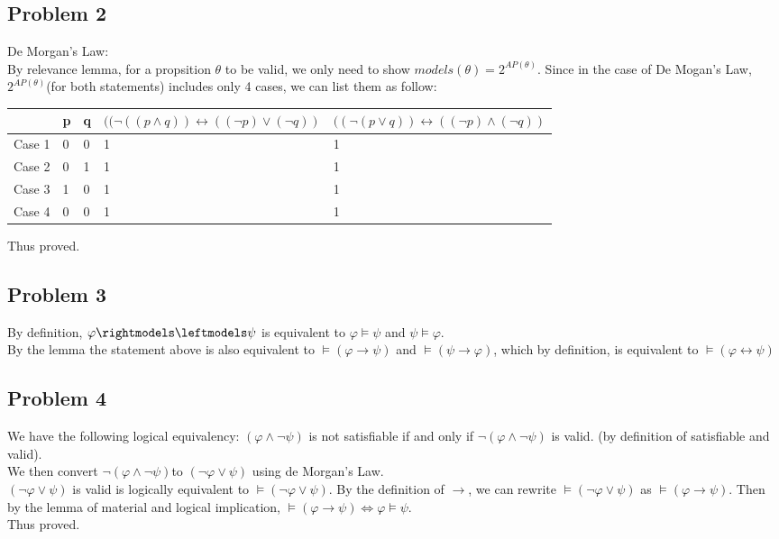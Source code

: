 \documentclass[12pt]{article}
\renewcommand{\phi}{\varphi}
\begin{document}
\subsection*{Problem 2}
De Morgan's Law:\\ 
By relevance lemma, for a propsition $\theta$ to be valid, we only need to show $models(\theta) = 2^{AP(\theta)}$. Since in the case of De Mogan's Law, $2^{AP(\theta)}$(for both statements) includes only 4 cases, we can list them as follow:

\begin{center}
\begin{tabular}{|l|l|l|l|l|}
\hline
       & p & q & $((\neg((p \wedge q)) \leftrightarrow ((\neg p) \vee (\neg q))$ & $((\neg (p \vee q)) \leftrightarrow ((\neg p) \wedge (\neg q))$ \\ \hline
Case 1 & 0 & 0 & 1         & 1        \\ \hline
Case 2 & 0 & 1 & 1         & 1        \\ \hline
Case 3 & 1 & 0 & 1         & 1        \\ \hline
Case 4 & 0 & 0 & 1         & 1        \\ \hline
\end{tabular}
\end{center}
Thus proved. 
\subsection*{Problem 3}
By definition, $\phi \rightmodels\leftmodels  \psi$ is equivalent to $\phi \models \psi$ and $\psi \models \phi$.\\
By the lemma the statement above is also equivalent to $\models (\phi \rightarrow \psi)$ and $\models (\psi \rightarrow \phi)$, which by definition, is equivalent to $\models (\phi \leftrightarrow \psi)$
\subsection*{Problem 4}
We have the following logical equivalency: $(\phi \wedge \neg \psi)$ is not satisfiable if and only if $\neg(\phi \wedge \neg \psi)$ is valid. (by definition of satisfiable and valid).\\
We then convert $\neg(\phi \wedge \neg \psi)$to $(\neg \phi \vee \psi)$ using de Morgan's Law.\\
$(\neg \phi \vee \psi)$ is valid is logically equivalent to $\models(\neg \phi \vee \psi)$. By the definition of $\rightarrow$, we can rewrite $\models(\neg \phi \vee \psi)$ as $\models (\phi \rightarrow \psi)$. Then by the lemma of material and logical implication, $\models (\phi \rightarrow \psi) \Leftrightarrow \phi \models \psi$.\\[5pt]
Thus proved. 
\end{document}

